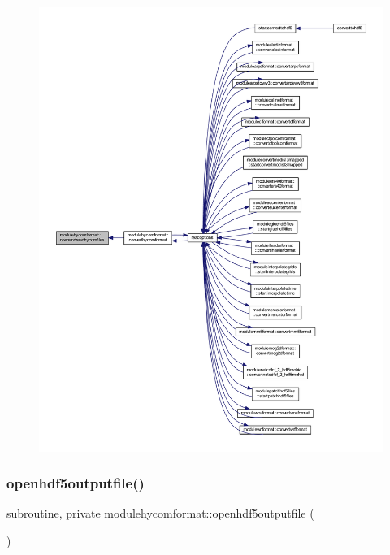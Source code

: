 \begin{figure}[H]
\begin{center}
\leavevmode
\includegraphics[width=350pt]{namespacemodulehycomformat_acba9e941ba6903be2a19cdc9e036cd64_icgraph}
\end{center}
\end{figure}
\mbox{\label{namespacemodulehycomformat_a87713c6e54c1c8b7b1a0fd423c3a6acf}} 
\subsubsection{\texorpdfstring{openhdf5outputfile()}{openhdf5outputfile()}}
{\footnotesize\ttfamily subroutine, private modulehycomformat\+::openhdf5outputfile (\begin{DoxyParamCaption}{ }\end{DoxyParamCaption})\hspace{0.3cm}{\ttfamily [private]}}

